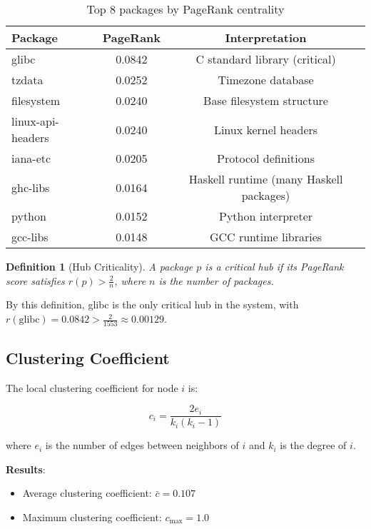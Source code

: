 \documentclass[11pt,a4paper]{article}
\newtheorem{definition}{Definition}
\begin{document}
\begin{table}[h]
\centering
\begin{tabular}{lcc}
\toprule
\textbf{Package} & \textbf{PageRank} & \textbf{Interpretation} \\
\midrule
glibc & 0.0842 & C standard library (critical) \\
tzdata & 0.0252 & Timezone database \\
filesystem & 0.0240 & Base filesystem structure \\
linux-api-headers & 0.0240 & Linux kernel headers \\
iana-etc & 0.0205 & Protocol definitions \\
ghc-libs & 0.0164 & Haskell runtime (many Haskell packages) \\
python & 0.0152 & Python interpreter \\
gcc-libs & 0.0148 & GCC runtime libraries \\
\bottomrule
\end{tabular}
\caption{Top 8 packages by PageRank centrality}
\label{tab:pagerank}
\end{table}

\begin{definition}[Hub Criticality]
A package $p$ is a \textit{critical hub} if its PageRank score satisfies $r(p) > \frac{2}{n}$, where $n$ is the number of packages.
\end{definition}

By this definition, glibc is the only critical hub in the system, with $r(\text{glibc}) = 0.0842 > \frac{2}{1553} \approx 0.00129$.

\subsection{Clustering Coefficient}

The local clustering coefficient for node $i$ is:

\begin{equation}
c_i = \frac{2e_i}{k_i(k_i - 1)}
\end{equation}

where $e_i$ is the number of edges between neighbors of $i$ and $k_i$ is the degree of $i$.

\textbf{Results}:
\begin{itemize}
\item Average clustering coefficient: $\bar{c} = 0.107$
\item Maximum clustering coefficient: $c_{\max} = 1.0$
\end{itemize}
\end{document}
